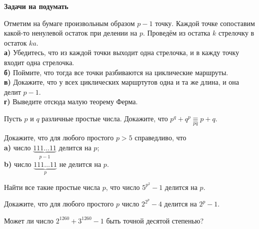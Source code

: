 \begin{center}
\textbf{Задачи на подумать}
\end{center}
\begin{problems}
\item Отметим на бумаге произвольным образом $p-1$ точку. Каждой точке сопоставим какой-то ненулевой остаток при делении на $p$. Проведём из остатка $k$ стрелочку в остаток $ka$. \\ \textbf{а)} Убедитесь, что из каждой точки выходит одна стрелочка, и в кажду точку входит одна стрелочка.\\ 
\textbf{б)} Поймите, что тогда все точки разбиваются на циклические маршруты. \\ 
\textbf{в)} Докажите, что у всех циклических маршртутов одна и та же длина, и она делит $p-1$.\\ 
\textbf{г)} Выведите отсюда малую теорему Ферма.

\item Пусть $p$ и $q$ различные простые числа. Докажите, что $p^q+q^p \mathop{\equiv}\limits_{pq} p+q$.
\item Докажите, что для любого простого $p>5$ справедливо, что
\\ \textbf{a)} число $\underbrace{111\ldots11}_{p-1}$ делится на $p$;
\\ \textbf{b)} число $\underbrace{111\ldots11}_{p}$ не делится на $p$.
\item Найти все такие простые числа $p$, что число $5^{p^2}-1$ делится на $p$.  
\item Докажите, что для любого простого $p$ число $2^{2^p}-4$ делится на $2^p-1$. 
\item Может ли число $2^{1260} + 3^{1260} - 1$ быть точной десятой степенью?








\end{problems}
